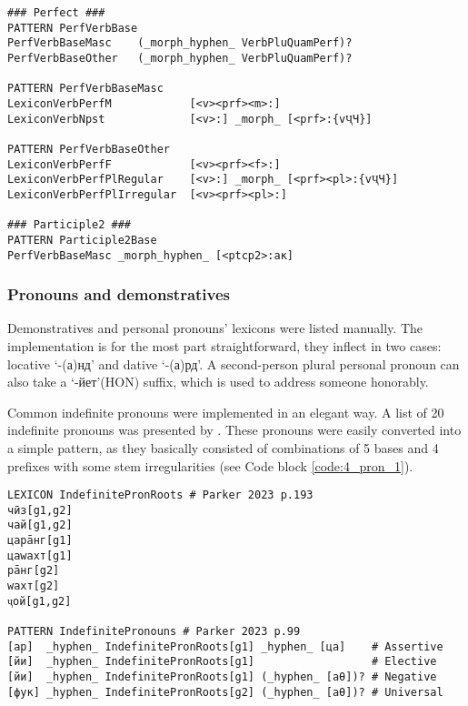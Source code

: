\begin{code_frame}[float,floatplacement=!h]
    \begin{footnotesize}\codespacing
    \begin{verbatim}
### Perfect ###
PATTERN PerfVerbBase
PerfVerbBaseMasc    (_morph_hyphen_ VerbPluQuamPerf)?
PerfVerbBaseOther   (_morph_hyphen_ VerbPluQuamPerf)?

PATTERN PerfVerbBaseMasc
LexiconVerbPerfM            [<v><prf><m>:]
LexiconVerbNpst             [<v>:] _morph_ [<prf>:{vҶЧ}]

PATTERN PerfVerbBaseOther
LexiconVerbPerfF            [<v><prf><f>:]
LexiconVerbPerfPlRegular    [<v>:] _morph_ [<prf><pl>:{vҶЧ}]
LexiconVerbPerfPlIrregular  [<v><prf><pl>:]

### Participle2 ###
PATTERN Participle2Base
PerfVerbBaseMasc _morph_hyphen_ [<ptcp2>:ак]               
    \end{verbatim}
    \end{footnotesize}
    \tcblower
    \label{code:4_verb_2}
\end{code_frame}

\FloatBarrier

\subsubsection*{Pronouns and demonstratives}
Demonstratives and personal pronouns' lexicons were listed manually. The implementation is for the most part straightforward, they inflect in two cases: locative `-(а)нд' and dative `-(а)рд'. A second-person plural personal pronoun can also take a `-йет'(HON) suffix, which is used to address someone honorably.

Common indefinite pronouns were implemented in an elegant way. A list of 20 indefinite pronouns was presented by \textcite[Table 6.4]{parker_shughni_2023}. These pronouns were easily converted into a simple pattern, as they basically consisted of combinations of 5 bases and 4 prefixes with some stem irregularities (see Code block \ref{code:4_pron_1}).

\begin{code_frame}[float,floatplacement=!h]
    \begin{footnotesize}\codespacing
    \begin{verbatim}
LEXICON IndefinitePronRoots # Parker 2023 p.193
чӣз[g1,g2]
чай[g1,g2]
царāнг[g1]
цаwахт[g1]
рāнг[g2]
wахт[g2]
ҷой[g1,g2]

PATTERN IndefinitePronouns # Parker 2023 p.99
[ар]  _hyphen_ IndefinitePronRoots[g1] _hyphen_ [ца]    # Assertive
[йи]  _hyphen_ IndefinitePronRoots[g1]                  # Elective
[йи]  _hyphen_ IndefinitePronRoots[g1] (_hyphen_ [аθ])? # Negative
[фук] _hyphen_ IndefinitePronRoots[g2] (_hyphen_ [аθ])? # Universal             
    \end{verbatim}
    \end{footnotesize}
    \tcblower
    \label{code:4_pron_1}
\end{code_frame}

